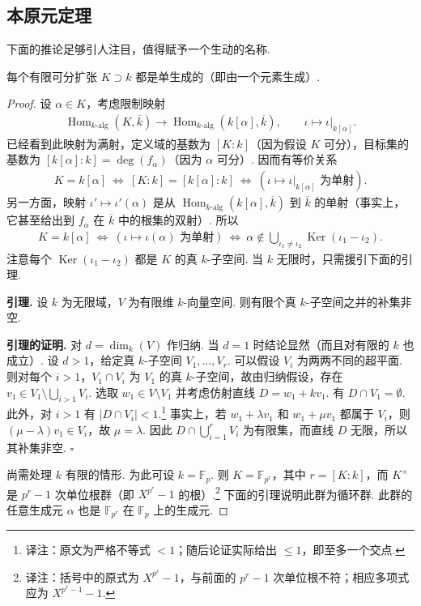 \subsection{本原元定理}\label{sec:galois-2-5-5}
下面的推论足够引人注目，值得赋予一个生动的名称.
\begin{corollary*}[{本原元定理}]
每个有限可分扩张 $K\supset k$ 都是单生成的（即由一个元素生成）.
\end{corollary*}
\begin{proof}
设 $\alpha\in K$，考虑限制映射
\begin{align*}
\operatorname{Hom}_{k\text{-alg}}(K,\overline k)\longrightarrow\operatorname{Hom}_{k\text{-alg}}(k[\alpha],\overline k),\qquad\iota\longmapsto\iota|_{k[\alpha]}.
\end{align*}
已经看到此映射为满射，定义域的基数为 $[K:k]$（因为假设 $K$ 可分），目标集的基数为 $[k[\alpha]:k]=\deg(f_\alpha)$（因为 $\alpha$ 可分）. 因而有等价关系
\begin{align*}
K=k[\alpha]\ \Longleftrightarrow\ [K:k]=[k[\alpha]:k]\ \Longleftrightarrow\ (\iota\mapsto\iota|_{k[\alpha]}\text{ 为单射}).
\end{align*}
另一方面，映射 $\iota'\mapsto\iota'(\alpha)$ 是从 $\operatorname{Hom}_{k\text{-alg}}(k[\alpha],\overline k)$ 到 $\overline k$ 的单射（事实上，它甚至给出到 $f_\alpha$ 在 $\overline k$ 中的根集的双射）. 所以
\begin{align*}
K=k[\alpha]\ \Longleftrightarrow\ (\iota\mapsto\iota(\alpha)\text{ 为单射})\ \Longleftrightarrow\ \alpha\notin\bigcup_{\iota_1\ne\iota_2}\operatorname{Ker}(\iota_1-\iota_2).
\end{align*}
注意每个 $\operatorname{Ker}(\iota_1-\iota_2)$ 都是 $K$ 的真 $k$-子空间. 当 $k$ 无限时，只需援引下面的引理.

\noindent\textbf{引理.} 设 $k$ 为无限域，$V$ 为有限维 $k$-向量空间. 则有限个真 $k$-子空间之并的补集非空.

\noindent\textbf{引理的证明.} 对 $d=\dim_k(V)$ 作归纳. 当 $d=1$ 时结论显然（而且对有限的 $k$ 也成立）. 设 $d>1$，给定真 $k$-子空间 $V_1,\ldots,V_r$. 可以假设 $V_i$ 为两两不同的超平面. 则对每个 $i>1$，$V_1\cap V_i$ 为 $V_1$ 的真 $k$-子空间，故由归纳假设，存在 $v_1\in V_1\setminus\bigcup_{i>1}V_i$. 选取 $w_1\in V\setminus V_1$ 并考虑仿射直线 $D=w_1+kv_1$. 有 $D\cap V_1=\emptyset$. 此外，对 $i>1$ 有 $|D\cap V_i|<1$.\footnote{译注：原文为严格不等式 $<1$；随后论证实际给出 $\leqslant1$，即至多一个交点.} 事实上，若 $w_1+\lambda v_1$ 和 $w_1+\mu v_1$ 都属于 $V_i$，则 $(\mu-\lambda)v_1\in V_i$，故 $\mu=\lambda$. 因此 $D\cap\bigcup_{i=1}^rV_i$ 为有限集，而直线 $D$ 无限，所以其补集非空. $\square$

尚需处理 $k$ 有限的情形. 为此可设 $k=\mathbb F_p$. 则 $K=\mathbb F_{p^r}$，其中 $r=[K:k]$，而 $K^\times$ 是 $p^r-1$ 次单位根群（即 $X^{p^r}-1$ 的根）.\footnote{译注：括号中的原式为 $X^{p^r}-1$，与前面的 $p^r-1$ 次单位根不符；相应多项式应为 $X^{p^r-1}-1$.} 下面的引理说明此群为循环群. 此群的任意生成元 $\alpha$ 也是 $\mathbb F_{p^r}$ 在 $\mathbb F_p$ 上的生成元.
\end{proof}
